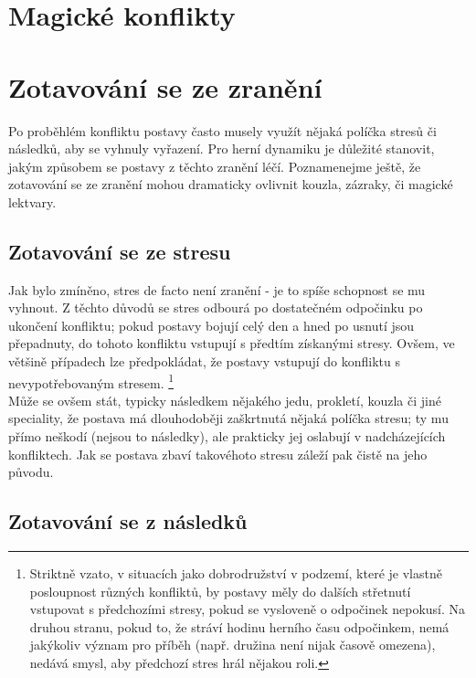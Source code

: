 \section{Magické konflikty}
\label{sec:magicke-konflikty}

\section{Zotavování se ze zranění}
\label{sec:zotavovanise}

Po proběhlém konfliktu postavy často musely využít nějaká políčka stresů či následků, aby se vyhnuly vyřazení. Pro herní dynamiku je důležité stanovit, jakým způsobem se postavy z těchto zranění léčí. Poznamenejme ještě, že zotavování se ze zranění mohou dramaticky ovlivnit kouzla, zázraky, či magické lektvary.

\subsection{Zotavování se ze stresu}
\label{sec:zot-stresy}

Jak bylo zmíněno, stres de facto není zranění - je to spíše schopnost se mu vyhnout. Z těchto důvodů se stres odbourá po dostatečném odpočinku po ukončení konfliktu; pokud postavy bojují celý den a hned po usnutí jsou přepadnuty, do tohoto konfliktu vstupují s předtím získanými stresy. Ovšem, ve většině případech lze předpokládat, že postavy vstupují do konfliktu s nevypotřebovaným stresem. \footnote{Striktně vzato, v situacích jako dobrodružství v podzemí, které je vlastně posloupnost různých konfliktů, by postavy měly do dalších střetnutí vstupovat s předchozími stresy, pokud se vysloveně o odpočinek nepokusí. Na druhou stranu, pokud to, že stráví hodinu herního času odpočinkem, nemá jakýkoliv význam pro příběh (např. družina není nijak časově omezena), nedává smysl, aby předchozí stres hrál nějakou roli.}\\
Může se ovšem stát, typicky následkem nějakého jedu, prokletí, kouzla či jiné speciality, že postava má dlouhodoběji zaškrtnutá nějaká políčka stresu; ty mu přímo neškodí (nejsou to následky), ale prakticky jej oslabují v nadcházejících konfliktech. Jak se postava zbaví takovéhoto stresu záleží pak čistě na jeho původu.

\subsection{Zotavování se z následků}
\label{sec:zot-nasledky}

